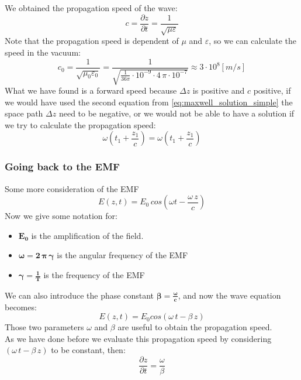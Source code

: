 We obtained the propagation speed of the wave:
\begin{equation}
    c=\frac{\partial z}{\partial t}=\frac{1}{\sqrt{\mu \varepsilon}}
\end{equation}
Note that the propagation speed is dependent of $\mu$ and $\varepsilon$, so we can calculate the speed in the vacuum:
\begin{equation}
    c_0=\frac{1}{\sqrt{\mu_0 \varepsilon_0}}=\frac{1}{\sqrt{\frac{1}{36\pi}\cdot 10^{-9}\cdot 4\,\pi\cdot 10^{-7}}}\approx 3\cdot 10^{8}[m/s]
\end{equation}
What we have found is a forward speed because $\Delta z$ is positive and $c$ positive, if we would have used the second equation from \cref{eq:maxwell_solution_simple} the space path $\Delta z$ need to be negative, or we would not be able to have a solution if we try to calculate the propagation speed:
\begin{equation}
    \omega\left(t_1+\frac{z_1}{c}\right)=\omega\left(t_1+\frac{z_1}{c}\right)
\end{equation}
\subsubsection*{Going back to the EMF}
Some more consideration of the EMF
\begin{equation}
    E(z,t)=E_0\,cos(\omega t-\frac{\omega\,z}{c})
\end{equation}
Now we give some notation for:
\begin{itemize}
    \item $\bm{E_0}$ is the amplification of the field.
    \item $\bm{\omega=2\,\pi\,\gamma} $ is the angular frequency of the EMF
    \item $\bm{\gamma=\frac{1}{T}}$ is the frequency of the EMF
\end{itemize}
We can also introduce the phase constant $\bm{\beta=\frac{\omega}{c}}$, and now the wave equation becomes:
\begin{equation}
    E(z,t)=E_0cos(\omega\, t-\beta\,z)
\end{equation}
Those two parameters $\omega$ and $\beta$ are useful to obtain the propagation speed.\\
As we have done before we evaluate this propagation speed by considering $(\omega \,t-\beta \,z)$ to be constant, then:
\begin{equation}
    \frac{\partial z}{\partial t}=\frac{\omega}{\beta}
\end{equation}
